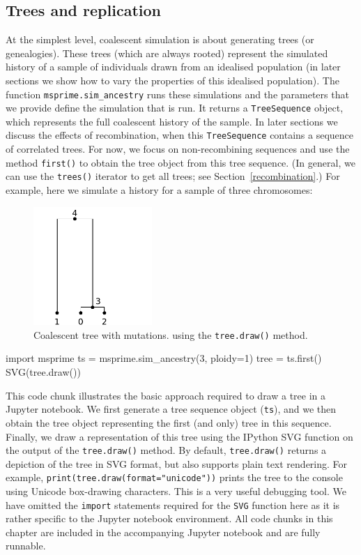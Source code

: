 \documentclass[graybox]{svmult}
\begin{document}
\subsection{Trees and replication}
At the simplest level, coalescent simulation is about generating trees (or genealogies).
These trees (which are always rooted) represent the simulated history of a sample of individuals
drawn from an idealised population (in later sections we show how to
vary the properties of this idealised population). The function
\texttt{msprime.sim_ancestry} runs these simulations and the parameters
that we provide define the simulation that is
run. It returns a \texttt{TreeSequence} object, which represents the
full coalescent history of the sample. In later sections we discuss the
effects of recombination, when this \texttt{TreeSequence} contains a
sequence of correlated trees. For now, we focus on non-recombining sequences and
use the method \texttt{first()} to obtain the
tree object from this tree sequence. (In general, we can use the \texttt{trees()} iterator
to get all trees; see Section~\ref{recombination}.) For example, here we simulate a
history for a sample of three chromosomes:

\begin{figure}[t]
\begin{center}
\includegraphics[width=0.4\textwidth]{images/plot_1.pdf}
\end{center}
\caption{\label{fig-simple-tree} Coalescent tree with mutations.
using the \texttt{tree.draw()} method.}
\end{figure}

\begin{pythoncode}
import msprime
ts = msprime.sim_ancestry(3, ploidy=1)
tree = ts.first()
SVG(tree.draw())
\end{pythoncode}

This code chunk illustrates the basic approach required to draw a tree
in a Jupyter notebook. We first generate a tree sequence object (\texttt{ts}),
and we then obtain the tree object representing the first (and only)
tree in this sequence. Finally, we draw a representation of this tree
using the IPython SVG function on the output of the \texttt{tree.draw()}
method. By default, \texttt{tree.draw()} returns a depiction of the tree
in SVG format, but also supports plain text rendering. For example,
\texttt{print(tree.draw(format="unicode"))} prints the tree to the console
using Unicode box-drawing characters. This is a very useful debugging tool.
We have omitted the \texttt{import} statements required for the \texttt{SVG}
function here as it is rather specific to the Jupyter notebook environment.
All code chunks in this chapter are included in the accompanying Jupyter
notebook and are fully runnable.
\end{document}
